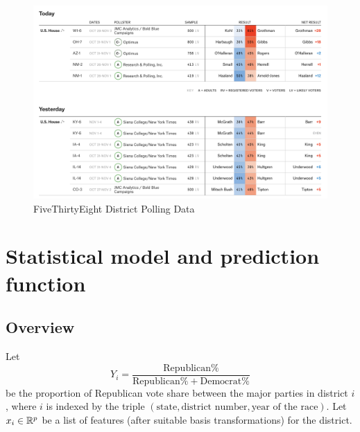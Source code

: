 \documentclass[11pt]{article}
\begin{document}
 \begin{figure}[tbh]
  \centering
  \includegraphics[scale=0.4]{district_polls}
  \caption{FiveThirtyEight District Polling Data}
  \label{fig:distpolls}
\end{figure}

\section{Statistical model and prediction function}
\label{sec:model}
\subsection{Overview}
Let \[Y_i = \frac{\text{Republican}\% }{\text{Republican}\% + \text{Democrat}\%}\] be the proportion of Republican vote share between the major parties in district $i$, where $i$ is indexed by the triple $(\text{state}, \text{district number}, \text{year of the race})$.
Let $x_i\in \mathbb{R}^p$ be a list of features (after suitable basis transformations)
for the district. 
\end{document}
